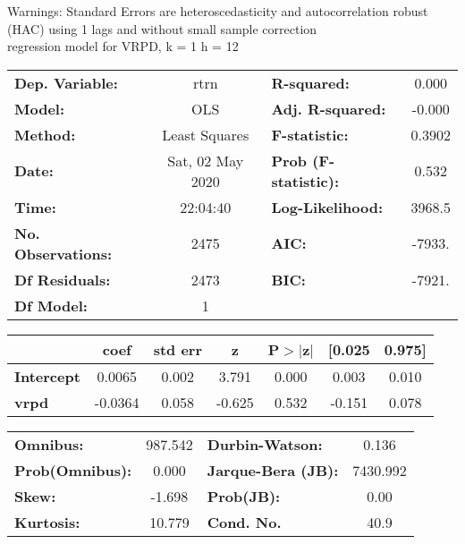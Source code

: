 Warnings: \newline
 [1] Standard Errors are heteroscedasticity and autocorrelation robust (HAC) using 1 lags and without small sample correction\\ 

regression model for VRPD, k = 1 h = 12\begin{center}
\begin{tabular}{lclc}
\toprule
\textbf{Dep. Variable:}    &       rtrn       & \textbf{  R-squared:         } &     0.000   \\
\textbf{Model:}            &       OLS        & \textbf{  Adj. R-squared:    } &    -0.000   \\
\textbf{Method:}           &  Least Squares   & \textbf{  F-statistic:       } &    0.3902   \\
\textbf{Date:}             & Sat, 02 May 2020 & \textbf{  Prob (F-statistic):} &    0.532    \\
\textbf{Time:}             &     22:04:40     & \textbf{  Log-Likelihood:    } &    3968.5   \\
\textbf{No. Observations:} &        2475      & \textbf{  AIC:               } &    -7933.   \\
\textbf{Df Residuals:}     &        2473      & \textbf{  BIC:               } &    -7921.   \\
\textbf{Df Model:}         &           1      & \textbf{                     } &             \\
\bottomrule
\end{tabular}
\begin{tabular}{lcccccc}
                   & \textbf{coef} & \textbf{std err} & \textbf{z} & \textbf{P$> |$z$|$} & \textbf{[0.025} & \textbf{0.975]}  \\
\midrule
\textbf{Intercept} &       0.0065  &        0.002     &     3.791  &         0.000        &        0.003    &        0.010     \\
\textbf{vrpd}      &      -0.0364  &        0.058     &    -0.625  &         0.532        &       -0.151    &        0.078     \\
\bottomrule
\end{tabular}
\begin{tabular}{lclc}
\textbf{Omnibus:}       & 987.542 & \textbf{  Durbin-Watson:     } &    0.136  \\
\textbf{Prob(Omnibus):} &   0.000 & \textbf{  Jarque-Bera (JB):  } & 7430.992  \\
\textbf{Skew:}          &  -1.698 & \textbf{  Prob(JB):          } &     0.00  \\
\textbf{Kurtosis:}      &  10.779 & \textbf{  Cond. No.          } &     40.9  \\
\bottomrule
\end{tabular}
\end{center}


